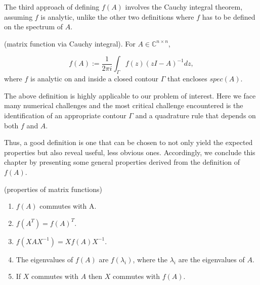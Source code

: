The third approach of defining $f(A)$ involves the Cauchy integral theorem, assuming $f$ is analytic, unlike the other two definitions where $f$ has to be defined on the spectrum of $A$.

\begin{definition}
    \label{def:2.7}
    \cite{8}(matrix function via Cauchy integral). For $A \in \mathbb{C}^{n \times n}$,

    \begin{equation}
        f(A) := \frac{1}{2\pi i} \int_\Gamma f(z)(zI - A)^{-1}dz,
        \label{eq:2.7}
    \end{equation}
    where $f$ is analytic on and inside a closed contour $\Gamma$ that encloses $spec(A)$.
\end{definition}

The above definition is highly applicable to our problem of interest. Here we face many numerical challenges and the most critical challenge encountered is the identification of an appropriate contour $\Gamma$ and a quadrature rule that depends on both $f$ and $A$.

Thus, a good definition is one that can be chosen to not only yield the expected properties but also reveal useful, less obvious ones. Accordingly, we conclude this chapter by presenting some general properties derived from the definition of $f(A)$.

\begin{remark}
\label{rem:2.8}
    (properties of matrix functions)\cite{8}
    \begin{enumerate}
        \item $f(A)$ commutes with A.
        \item $f(A^{T})=f(A)^{T}$.
        \item $f(XAX^{-1})=Xf(A)X^{-1}$.
        \item The eigenvalues of $f(A)$ are $f(\lambda_{i})$, where the $\lambda_{i}$ are the eigenvalues of $A$.
        \item If $X$ commutes with $A$ then $X$ commutes with $f(A)$.
    \end{enumerate}
\end{remark}